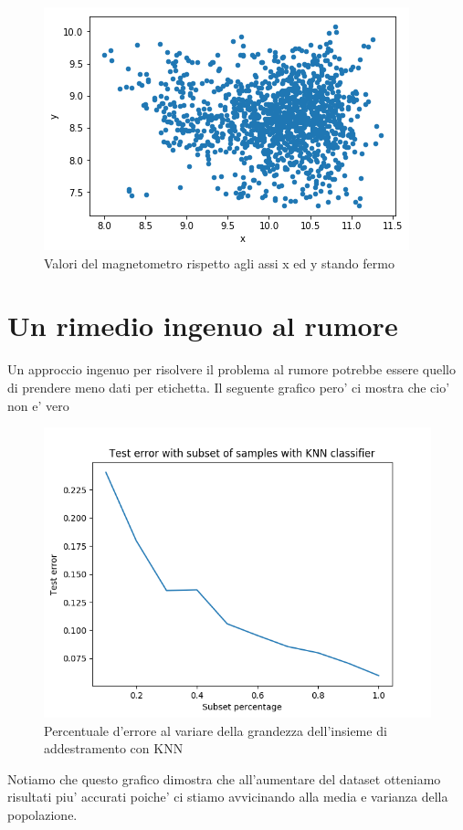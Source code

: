\begin{figure}[H]
	\centering
	\includegraphics[width=0.7\linewidth]{img/xystand}
	\caption{Valori del magnetometro rispetto agli assi x ed y stando fermo}
	\label{fig:xystand}
\end{figure}



\section{Un rimedio ingenuo al rumore}
Un approccio ingenuo per risolvere il problema al rumore potrebbe essere quello di prendere meno dati per etichetta. Il seguente grafico pero' ci mostra che cio' non e' vero

\begin{figure}[H]
	\centering
	\includegraphics[width=0.7\linewidth]{img/rumor_graph_knn}
	\caption{Percentuale d'errore al variare della grandezza dell'insieme di addestramento con KNN}
	\label{fig:rumorgraphknn}
\end{figure}

Notiamo che questo grafico dimostra che all'aumentare del dataset otteniamo risultati piu' accurati poiche' ci stiamo avvicinando alla media e varianza della popolazione.

